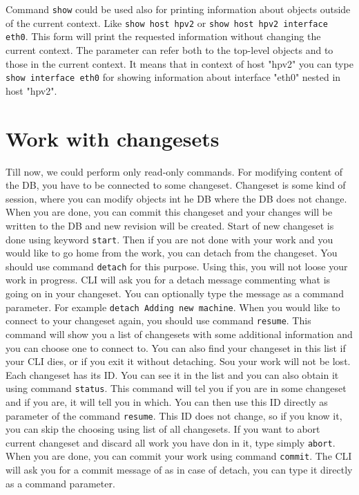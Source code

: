 \documentclass[deska]{subfiles}
\begin{document}
Command {\tt show} could be used also for printing information about objects outside of the current context. Like {\tt show host hpv2} or
{\tt show host hpv2 interface eth0}. This form will print the requested information without changing the current context.
The parameter can refer both to the top-level objects and to those in the current context. It means that in context of host "hpv2" you can type {\tt show interface eth0}
for showing information about interface "eth0" nested in host "hpv2".

\section{Work with changesets}

Till now, we could perform only read-only commands. For modifying content of the DB, you have to be connected to some changeset.
Changeset is some kind of session, where you can modify objects int he DB where the DB does not change. When you are done,
you can commit this changeset and your changes will be written to the DB and new revision will be created.
Start of new changeset is done using keyword {\tt start}. Then if you are not done with your work and you would like to
go home from the work, you can detach from the changeset. You should use command {\tt detach} for this purpose. Using
this, you will not loose your work in progress. CLI will ask you for a detach message commenting what is going on in
your changeset. You can optionally type the message as a command parameter. For example {\tt detach Adding new machine}.
When you would like to connect to your changeset again, you should use command {\tt resume}. This command will show
you a list of changesets with some additional information and you can choose one to connect to. You can also find your
changeset in this list if your CLI dies, or if you exit it without detaching. Sou your work will not be lost. Each changeset has
its ID. You can see it in the list and you can also obtain it using command {\tt status}. This command will tel you
if you are in some changeset and if you are, it will tell you in which. You can then use this ID directly as parameter
of the command {\tt resume}. This ID does not change, so if you know it, you can skip the choosing using list of
all changesets. If you want to abort current changeset and discard all work you have don in it, type simply {\tt abort}.
When you are done, you can commit your work using command {\tt commit}. The CLI will ask you for a commit message of as
in case of detach, you can type it directly as a command parameter.
\end{document}
